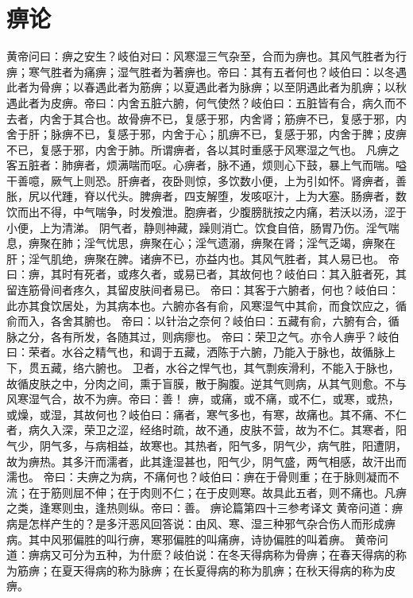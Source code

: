 \documentclass[a4paper,12pt,UTF8,twoside]{ctexbook}
\begin{document}
\chapter{痹论}
黄帝问曰：痹之安生？岐伯对曰：风寒湿三气杂至，合而为痹也。其风气胜者为行痹；寒气胜者为痛痹；湿气胜者为著痹也。帝曰：其有五者何也？岐伯曰：以冬遇此者为骨痹；以春遇此者为筋痹；以夏遇此者为脉痹；以至阴遇此者为肌痹；以秋遇此者为皮痹。帝曰：内舍五脏六腑，何气使然？岐伯曰：五脏皆有合，病久而不去者，内舍于其合也。故骨痹不已，复感于邪，内舍肾；筋痹不已，复感于邪，内舍于肝；脉痹不已，复感于邪，内舍于心；肌痹不已，复感于邪，内舍于脾；皮痹不已，复感于邪，内舍于肺。所谓痹者，各以其时重感于风寒湿之气也。
凡痹之客五脏者：肺痹者，烦满喘而呕。心痹者，脉不通，烦则心下鼓，暴上气而喘。嗌干善噫，厥气上则恐。肝痹者，夜卧则惊，多饮数小便，上为引如怀。肾痹者，善胀，尻以代踵，脊以代头。脾痹者，四支解堕，发咳呕汁，上为大塞。肠痹者，数饮而出不得，中气喘争，时发飧泄。胞痹者，少腹膀胱按之内痛，若沃以汤，涩于小便，上为清涕。
阴气者，静则神藏，躁则消亡。饮食自倍，肠胃乃伤。淫气喘息，痹聚在肺；淫气忧思，痹聚在心；淫气遗溺，痹聚在肾；淫气乏竭，痹聚在肝；淫气肌绝，痹聚在脾。诸痹不已，亦益内也。其风气胜者，其人易已也。
帝曰：痹，其时有死者，或疼久者，或易已者，其故何也？岐伯曰：其入脏者死，其留连筋骨间者疼久，其留皮肤间者易已。
帝曰：其客于六腑者，何也？岐伯曰：此亦其食饮居处，为其病本也。六腑亦各有俞，风寒湿气中其俞，而食饮应之，循俞而入，各舍其腑也。
帝曰：以针治之奈何？岐伯曰：五藏有俞，六腑有合，循脉之分，各有所发，各随其过，则病瘳也。
帝曰：荣卫之气。亦令人痹乎？岐伯曰：荣者。水谷之精气也，和调于五藏，洒陈于六腑，乃能入于脉也，故循脉上下，贯五藏，络六腑也。
卫者，水谷之悍气也，其气剽疾滑利，不能入于脉也，故循皮肤之中，分肉之间，熏于盲膜，散于胸腹。逆其气则病，从其气则愈。不与风寒湿气合，故不为痹。帝曰：善！
痹，或痛，或不痛，或不仁，或寒，或热，或燥，或湿，其故何也？岐伯曰：痛者，寒气多也，有寒，故痛也。其不痛、不仁者，病久入深，荣卫之涩，经络时疏，故不通，皮肤不营，故为不仁。其寒者，阳气少，阴气多，与病相益，故寒也。其热者，阳气多，阴气少，病气胜，阳遭阴，故为痹热。其多汗而濡者，此其逢湿甚也，阳气少，阴气盛，两气相感，故汗出而濡也。
帝曰：夫痹之为病，不痛何也？岐伯曰：痹在于骨则重；在于脉则凝而不流；在于筋则屈不伸；在于肉则不仁；在于皮则寒。故具此五者，则不痛也。凡痹之类，逢寒则虫，逢热则纵。帝曰：善。
痹论篇第四十三参考译文
黄帝问道：痹病是怎样产生的？是多汗恶风回答说：由风、寒、湿三种邪气杂合伤人而形成痹病。其中风邪偏胜的叫行痹，寒邪偏胜的叫痛痹，诗协偏胜的叫着痹。
黄帝问道：痹病又可分为五种，为什麽？岐伯说：在冬天得病称为骨痹；在春天得病的称为筋痹；在夏天得病的称为脉痹；在长夏得病的称为肌痹；在秋天得病的称为皮痹。
\end{document}
